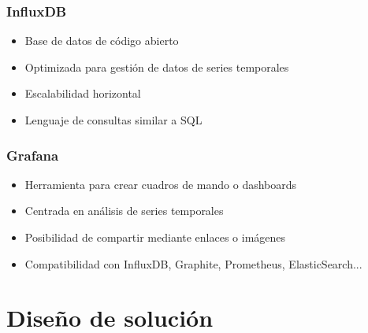 \documentclass[12pt]{beamer}
\begin{document}
        \begin{frame}
            \frametitle{InfluxDB}

            \begin{itemize}
                \item Base de datos de código abierto
                \item Optimizada para gestión de datos de series temporales
                \item Escalabilidad horizontal
                \item Lenguaje de consultas similar a SQL
            \end{itemize}
        \end{frame}

        \begin{frame}
            \frametitle{Grafana}

            \begin{itemize}
                \item Herramienta para crear cuadros de mando o dashboards
                \item Centrada en análisis de series temporales
                \item Posibilidad de compartir mediante enlaces o imágenes
                \item Compatibilidad con InfluxDB, Graphite, Prometheus, ElasticSearch...
            \end{itemize}
        \end{frame}

        \section{Diseño de solución}
\end{document}
